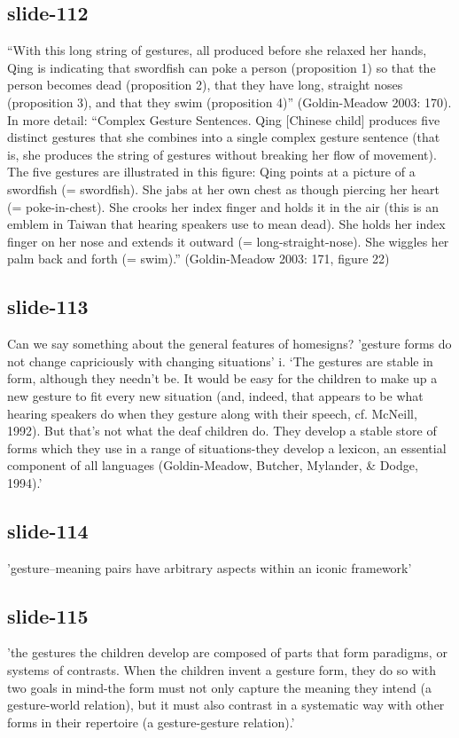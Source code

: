 \documentclass[12pt,\papersize]{extarticle}
\begin{document}
\subsection{slide-112}
“With this long string of gestures, all produced before she relaxed her hands, Qing is indicating that swordfish can poke a person (proposition 1) so that the person becomes dead (proposition 2), that they have long, straight noses (proposition 3), and that they swim (proposition 4)” (Goldin-Meadow 2003: 170).
In more detail: “Complex Gesture Sentences. Qing [Chinese child] produces five distinct gestures that she combines into a single complex gesture sentence (that is, she produces the string of gestures without breaking her flow of movement). The five gestures are illustrated in this figure: Qing points at a picture of a swordfish (= swordfish). She jabs at her own chest as though piercing her heart (= poke-in-chest). She crooks her index finger and holds it in the air (this is an emblem in Taiwan that hearing speakers use to mean dead). She holds her index finger on her nose and extends it outward (= long-straight-nose). She wiggles her palm back and forth (= swim).” (Goldin-Meadow 2003: 171, figure 22)
 
 
\subsection{slide-113}
Can we say something about the general features of homesigns?
'gesture forms do not change capriciously with changing situations'
i.	‘The gestures are stable in form, although they needn’t be. It would be easy for the children to make up a new gesture to fit every new situation (and, indeed, that appears to be what hearing speakers do when they gesture along with their speech, cf. McNeill, 1992). But that’s not what the deaf children do. They develop a stable store of forms which they use in a range of situations-they develop a lexicon, an essential component of all languages (Goldin-Meadow, Butcher, Mylander, \& Dodge, 1994).’ \citep[p.\ 1389]{Goldin-Meadow:2002dq}
 
 
\subsection{slide-114}
'gesture--meaning pairs have arbitrary aspects within an iconic framework'
 
 
\subsection{slide-115}
'the gestures the children develop are composed of parts that form paradigms, or systems of contrasts. When the children invent a gesture form, they do so with two goals in mind-the form must not only capture the meaning they intend (a gesture-world relation), but it must also contrast in a systematic way with other forms in their repertoire (a gesture-gesture relation).' \citep[p.\ 1389]{Goldin-Meadow:2002dq}
 
\end{document}

